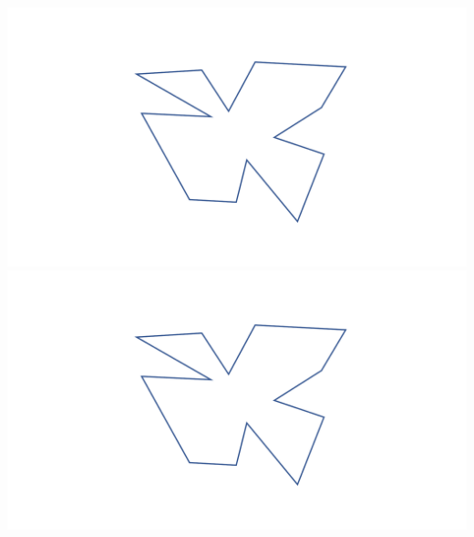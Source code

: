 \documentclass[a4paper,12pt]{article}
\begin{document}
\begin{center}
\vspace{25pt}
\includegraphics[width=0.375\linewidth]{../images/worksheet3_no_color.pdf}\hspace{50pt}
\includegraphics[width=0.375\linewidth]{../images/worksheet3_no_color.pdf}
\end{center}
\end{document}
